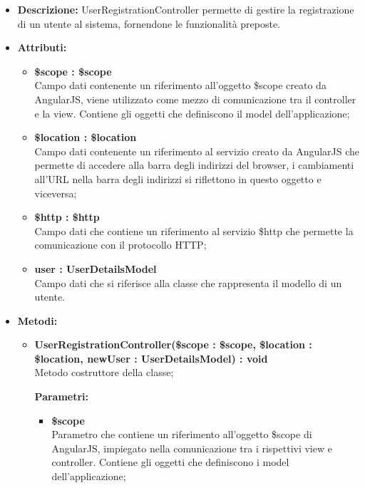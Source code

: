 \begin{itemize}
	\item \textbf{Descrizione:} UserRegistrationController permette di gestire la registrazione di un
utente al sistema, fornendone le funzionalità preposte.
	\item \textbf{Attributi:}
		\begin{itemize}
		
			\item \textbf{\$scope : \$scope}\\
			Campo dati contenente un riferimento all'oggetto \$scope creato da AngularJS, viene utilizzato come mezzo di comunicazione tra il controller e la view. Contiene gli oggetti che definiscono il model dell'applicazione;
			
			\item \textbf{\$location : \$location}\\
			Campo dati contenente un riferimento al servizio creato da AngularJS che permette di accedere alla barra degli indirizzi del browser, i cambiamenti all'URL nella barra degli indirizzi si riflettono in questo oggetto e viceversa;

			\item \textbf{\$http : \$http }\\
			Campo dati che contiene un riferimento al servizio \$http che permette la comunicazione con il protocollo HTTP;
				
			\item \textbf{user : UserDetailsModel }\\
			Campo dati che si riferisce alla classe che rappresenta il modello di un utente.
				
		\end{itemize}
	\item \textbf{Metodi:}
		\begin{itemize}
		
			\item \textbf{UserRegistrationController(\$scope : \$scope, \$location : \$location, newUser : UserDetailsModel) : void}\\
			Metodo costruttore della classe;
			\begin{description}
    			\item[\textbf{Parametri:}]
			\end{description}
			\begin{itemize}
				\item \textbf{\$scope}\\
				Parametro che contiene un riferimento all'oggetto \$scope di AngularJS, impiegato nella comunicazione tra i rispettivi view e controller. Contiene gli oggetti che definiscono i model dell'applicazione;
				

\end{itemize}
\end{itemize}
\end{itemize}
